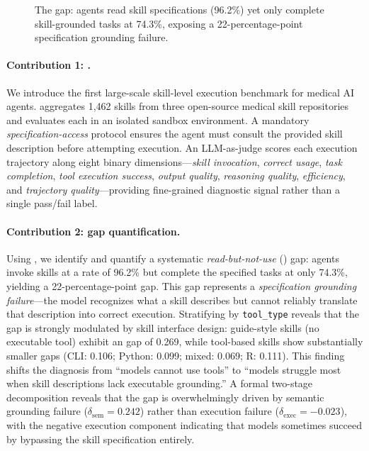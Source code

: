 \begin{figure}[t]
\caption{The \rbu gap: agents read skill specifications (96.2\%) yet only complete skill-grounded tasks at 74.3\%, exposing a 22-percentage-point specification grounding failure.}
\label{fig:teaser}
\end{figure}

\paragraph{Contribution 1: \medskillbench.}
We introduce the first large-scale skill-level execution benchmark for medical AI agents.
\medskillbench aggregates 1,462 skills from three open-source medical skill repositories and evaluates each in an isolated sandbox environment.
A mandatory \emph{specification-access} protocol ensures the agent must consult the provided skill description before attempting execution.
An LLM-as-judge scores each execution trajectory along eight binary dimensions---\emph{skill invocation}, \emph{correct usage}, \emph{task completion}, \emph{tool execution success}, \emph{output quality}, \emph{reasoning quality}, \emph{efficiency}, and \emph{trajectory quality}---providing fine-grained diagnostic signal rather than a single pass/fail label.

\paragraph{Contribution 2: \rbu gap quantification.}
Using \medskillbench, we identify and quantify a systematic \emph{read-but-not-use} (\rbu) gap: agents invoke skills at a rate of 96.2\% but complete the specified tasks at only 74.3\%, yielding a 22-percentage-point gap.
This gap represents a \emph{specification grounding failure}---the model recognizes what a skill describes but cannot reliably translate that description into correct execution.
Stratifying by \texttt{tool\_type} reveals that the gap is strongly modulated by skill interface design: guide-style skills (no executable tool) exhibit an \rbu gap of 0.269, while tool-based skills show substantially smaller gaps (CLI: 0.106; Python: 0.099; mixed: 0.069; R: 0.111).
This finding shifts the diagnosis from ``models cannot use tools'' to ``models struggle most when skill descriptions lack executable grounding.''
A formal two-stage decomposition reveals that the gap is overwhelmingly driven by semantic grounding failure ($\delta_{\text{sem}} = 0.242$) rather than execution failure ($\delta_{\text{exec}} = -0.023$), with the negative execution component indicating that models sometimes succeed by bypassing the skill specification entirely.

